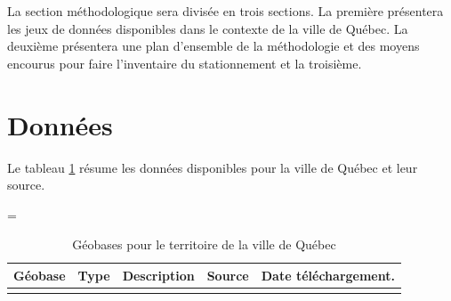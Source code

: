 \label{sec:Methodologie}


La section méthodologique sera divisée en trois sections. La première présentera les jeux de données disponibles dans le contexte de la ville de Québec. La deuxième présentera une plan d'ensemble de la méthodologie et des moyens encourus pour faire l'inventaire du stationnement et la troisième.


\section{Données}
Le tableau \ref{tab:donnees_disponibles_Québec} résume les données disponibles pour la ville de Québec et leur source.
\begin{landscape}
  \LTcapwidth=\textwidth
\begin{longtable}[h!]{p{.2 \linewidth} p{.1 \linewidth} p{.3 \linewidth} p{.15\linewidth} p{.125\linewidth} }
   
  
  \hline
   Géobase & Type & Description  & Source & Date téléchargement.\\ 
   \hline
   \hline
   \endhead
   \hline
   \endfoot
   \hline
   \caption{Géobases pour le territoire de la ville de Québec}
   \label{tab:donnees_disponibles_Québec}
   \endlastfoot
  

\end{longtable}
\end{landscape}
